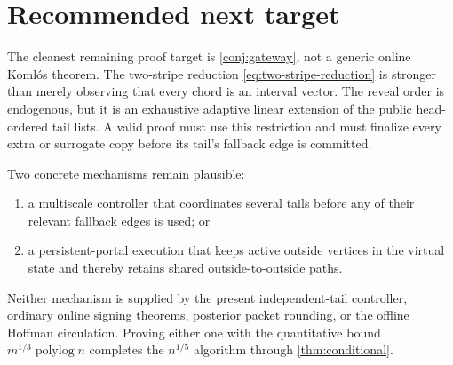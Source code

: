 \documentclass[11pt]{article}
\theoremstyle{remark}
\begin{document}
\section{Recommended next target}

The cleanest remaining proof target is \cref{conj:gateway}, not a generic
online Koml\'os theorem.  The two-stripe reduction
\eqref{eq:two-stripe-reduction} is stronger than merely observing that every
chord is an interval vector.  The reveal order is endogenous, but it is an
exhaustive adaptive linear extension of the public head-ordered tail lists.
A valid proof must use this restriction and must finalize every extra or
surrogate copy before its tail's fallback edge is committed.

Two concrete mechanisms remain plausible:
\begin{enumerate}[leftmargin=2em]
 \item a multiscale controller that coordinates several tails before any of
 their relevant fallback edges is used; or
 \item a persistent-portal execution that keeps active outside vertices in
 the virtual state and thereby retains shared outside-to-outside paths.
\end{enumerate}
Neither mechanism is supplied by the present independent-tail controller,
ordinary online signing theorems, posterior packet rounding, or the offline
Hoffman circulation.  Proving either one with the quantitative bound
$m^{1/3}\operatorname{polylog}n$ completes the $n^{1/5}$ algorithm through
\cref{thm:conditional}.
\end{document}

